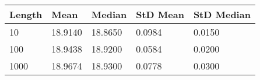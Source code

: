 
\begin{tabular}{lllll}

{\bf Length} & {\bf Mean} & {\bf Median} & 
  {\bf StD Mean} & {\bf StD Median} \\ \hline

10 & 18.9140 & 18.8650 & 0.0984  & 0.0150 \\
100 & 18.9438 & 18.9200 & 0.0584 & 0.0200 \\
1000 & 18.9674 & 18.9300 & 0.0778  & 0.0300 \\

\hline
\end{tabular}
